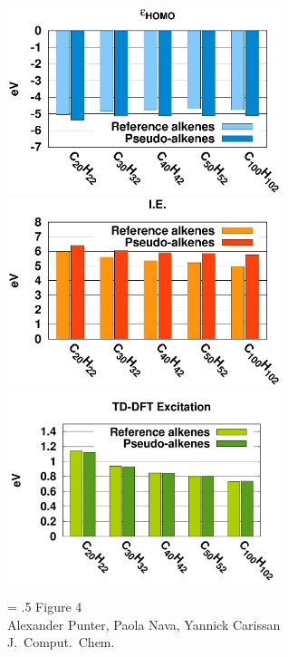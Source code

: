 \documentclass[12pt]{article}
\begin{document}
\begin{figure}
\begin{center}
\includegraphics[width=8cm]{long_pbe0_homo_uhf}\\
\includegraphics[width=8cm]{long_pbe0_ie_uhf}\\
\includegraphics[width=8cm]{long_pbe0_tddft}
\end{center}
{\Large
\begin{minipage}[t]{3in}
\baselineskip = .5\baselineskip
Figure 4 \\
Alexander Punter, Paola Nava, Yannick Carissan\\
J.\ Comput.\ Chem.
\end{minipage}
}
\end{figure}

\clearpage
\end{document}
